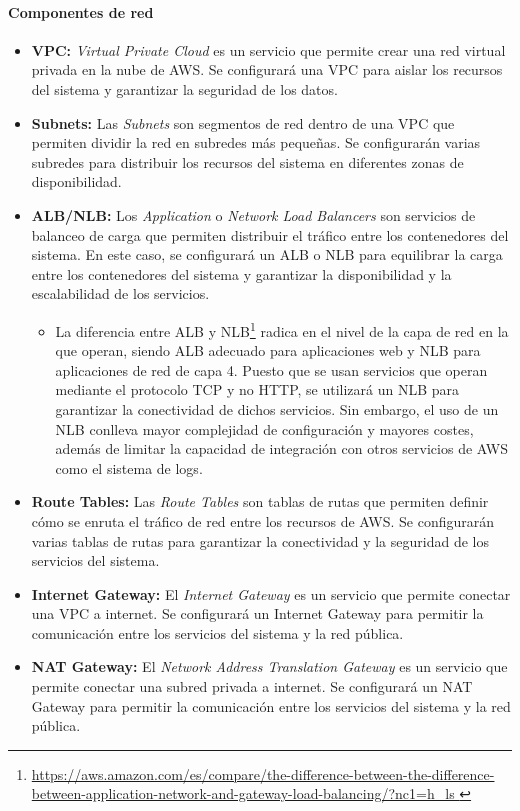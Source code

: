 \paragraph{Componentes de red}
\begin{itemize}
	\item \textbf{VPC:} \textit{Virtual Private Cloud} es un servicio que permite
		crear una red virtual privada en la nube de AWS. Se configurará una VPC
		para aislar los recursos del sistema y garantizar la seguridad de los
		datos.
	\item \textbf{Subnets:} Las \textit{Subnets} son segmentos de red dentro de
		una VPC que permiten dividir la red en subredes más pequeñas. Se
		configurarán varias subredes para distribuir los recursos del sistema en
		diferentes zonas de disponibilidad.
		\item \textbf{ALB/NLB:} Los \textit{Application} o \textit{Network Load
		Balancers} son servicios de balanceo de carga que permiten distribuir
		el tráfico entre los contenedores del sistema. En este caso, se
		configurará un ALB o NLB para equilibrar la carga entre los contenedores
		del sistema y garantizar la disponibilidad y la escalabilidad de los
		servicios. \begin{itemize}
			\item La diferencia entre ALB y NLB\footnote{\url{
					https://aws.amazon.com/es/compare/the-difference-between-the-difference-between-application-network-and-gateway-load-balancing/?nc1=h_ls
				}} radica en el nivel de la capa de red en la que operan, siendo
				ALB adecuado para aplicaciones web y NLB para aplicaciones de
				red de capa 4. Puesto que se usan servicios que operan
				mediante el protocolo TCP y no HTTP, se utilizará un NLB para
				garantizar la conectividad de dichos servicios. Sin embargo, el
				uso de un NLB conlleva mayor complejidad de configuración y
				mayores costes, además de limitar la capacidad de integración
				con otros servicios de AWS como el sistema de logs.
		\end{itemize}
	\item \textbf{Route Tables:} Las \textit{Route Tables} son tablas de rutas
		que permiten definir cómo se enruta el tráfico de red entre los
		recursos de AWS. Se configurarán varias tablas de rutas para garantizar
		la conectividad y la seguridad de los servicios del sistema.
	\item \textbf{Internet Gateway:} El \textit{Internet Gateway} es un servicio
		que permite conectar una VPC a internet. Se configurará un Internet
		Gateway para permitir la comunicación entre los servicios del sistema y
		la red pública.
	\item \textbf{NAT Gateway:} El \textit{Network Address Translation Gateway}
		es un servicio que permite conectar una subred privada a internet. Se
		configurará un NAT Gateway para permitir la comunicación entre los
		servicios del sistema y la red pública.
\end{itemize}

